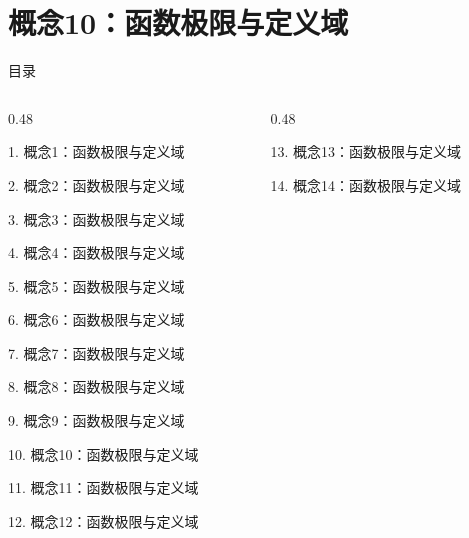 \documentclass[aspectratio=169,10pt,fontset=fandol]{ctexbeamer}
\begin{document}
\section{概念10：函数极限与定义域}
\begin{frame}[t,fragile]{目录}
\small
\begin{columns}[T,onlytextwidth]
\begin{column}{0.48\textwidth}
{\color{black}\small 1. 概念1：函数极限与定义域\par}\vspace{0.22em}
{\color{black}\small 2. 概念2：函数极限与定义域\par}\vspace{0.22em}
{\color{black}\small 3. 概念3：函数极限与定义域\par}\vspace{0.22em}
{\color{black}\small 4. 概念4：函数极限与定义域\par}\vspace{0.22em}
{\color{black}\small 5. 概念5：函数极限与定义域\par}\vspace{0.22em}
{\color{black}\small 6. 概念6：函数极限与定义域\par}\vspace{0.22em}
{\color{black}\small 7. 概念7：函数极限与定义域\par}\vspace{0.22em}
{\color{black}\small 8. 概念8：函数极限与定义域\par}\vspace{0.22em}
{\color{black}\small 9. 概念9：函数极限与定义域\par}\vspace{0.22em}
{\color{blue}\small 10. 概念10：函数极限与定义域\par}\vspace{0.22em}
{\color{gray!40}\small 11. 概念11：函数极限与定义域\par}\vspace{0.22em}
{\color{gray!40}\small 12. 概念12：函数极限与定义域\par}\vspace{0.22em}
\end{column}
\begin{column}{0.48\textwidth}
{\color{gray!40}\small 13. 概念13：函数极限与定义域\par}\vspace{0.22em}
{\color{gray!40}\small 14. 概念14：函数极限与定义域\par}\vspace{0.22em}

\end{column}
\end{columns}
\end{frame}
\end{document}
